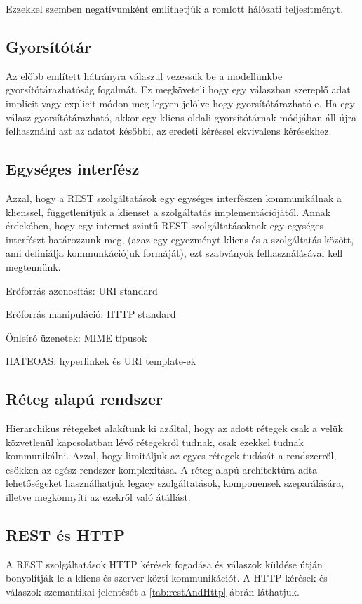Ezzekkel szemben negatívumként említhetjük a romlott hálózati teljesítményt.

\subsection{Gyorsítótár}

Az előbb említett hátrányra válaszul vezessük be a modellünkbe gyorsítótárazhatóság fogalmát. Ez megköveteli hogy egy válaszban szereplő adat implicit vagy explicit módon meg legyen jelölve hogy gyorsítótárazható-e. Ha egy válasz gyorsítótárazható, akkor egy kliens oldali gyorsítótárnak módjában áll újra felhasználni azt az adatot későbbi, az eredeti kéréssel ekvivalens kérésekhez.

\subsection{Egységes interfész}

Azzal, hogy a REST szolgáltatások egy egységes interfészen kommunikálnak a klienssel, függetlenítjük a klienset a szolgáltatás implementációjától. Annak érdekében, hogy egy internet szintű REST szolgáltatásoknak egy egységes interfészt határozzunk meg, (azaz egy egyezményt kliens és a szolgáltatás között, ami definiálja kommunkációjuk formáját), ezt szabványok felhasználásával kell megtennünk.

\begin{listing}
	\item Erőforrás azonosítás: URI standard \cite{RFC3986}
	\item Erőforrás manipuláció: HTTP standard \cite{RFC2616}
	\item Önleíró üzenetek: MIME típusok \cite{RFC2045}
	\item HATEOAS: hyperlinkek és URI template-ek \cite{RFC6570}
\end{listing}

\subsection{Réteg alapú rendszer}

Hierarchikus rétegeket alakítunk ki azáltal, hogy az adott rétegek csak a velük közvetlenül kapcsolatban lévő rétegekről tudnak, csak ezekkel tudnak kommunikálni. Azzal, hogy limitáljuk az egyes rétegek tudását a rendszerről, csökken az egész rendszer komplexitása. A réteg alapú architektúra adta lehetőségeket használhatjuk legacy szolgáltatások, komponensek szeparálására, illetve megkönnyíti az ezekről való átállást.

\subsection{REST és HTTP}

A REST szolgáltatások HTTP kérések fogadása és válaszok küldése útján bonyolítják le a kliens és szerver közti kommunikációt. A HTTP kérések és válaszok szemantikai jelentését a \ref{tab:restAndHttp} ábrán láthatjuk.